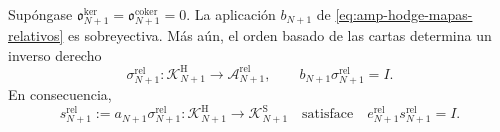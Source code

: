 \begin{lemma}
\label{lem:amp-hodge-sobreyectividad-relativa}
Supóngase
\(\mathfrak o_{N+1}^{\ker}
=\mathfrak o_{N+1}^{\mathrm{coker}}=0\).
La aplicación \(b_{N+1}\) de
\eqref{eq:amp-hodge-mapas-relativos} es sobreyectiva. Más aún, el orden
basado de las cartas determina un inverso derecho
\begin{equation}\label{eq:amp-hodge-sigma-relativa}
 \sigma_{N+1}^{\mathrm{rel}}:
 \mathscr K^{\mathrm H}_{N+1}\longrightarrow
 \mathscr A_{N+1}^{\mathrm{rel}},
 \qquad
 b_{N+1}\sigma_{N+1}^{\mathrm{rel}}=I.
\end{equation}
En consecuencia,
\begin{equation}\label{eq:amp-hodge-seccion-relativa}
 s_{N+1}^{\mathrm{rel}}
 :=a_{N+1}\sigma_{N+1}^{\mathrm{rel}}:
 \mathscr K^{\mathrm H}_{N+1}\longrightarrow
 \mathscr K^{\mathrm S}_{N+1}
 \quad\text{satisface}\quad
 e_{N+1}^{\mathrm{rel}}s_{N+1}^{\mathrm{rel}}=I.
\end{equation}
\end{lemma}

